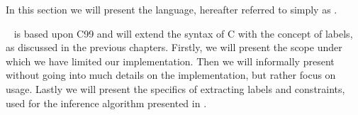
In this section we will present the \thelanglong language, hereafter referred to simply as \thelang.

\thelang~ is based upon C99 and will extend the syntax of C with the concept of labels, as discussed in the previous chapters.
Firstly, we will present the scope under which we have limited our implementation.
Then we will informally present \thelang~ without going into much details on the implementation, but rather focus on usage.
Lastly we will present the specifics of extracting labels and constraints, used for the inference algorithm presented in .
